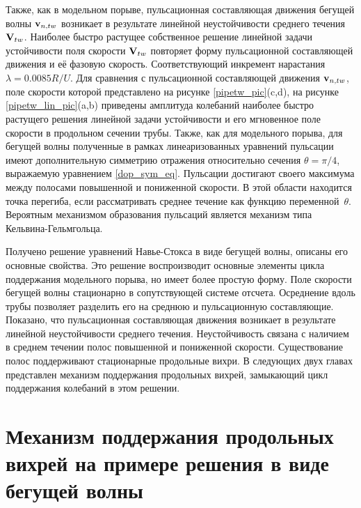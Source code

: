 Также, как в модельном порыве, пульсационная составляющая движения бегущей волны $\mathbf{v}_{n,tw}$ возникает в результате линейной неустойчивости среднего течения $\mathbf{V}_{tw}$. Наиболее быстро растущее собственное решение линейной задачи устойчивости поля скорости $\mathbf{V}_{tw}$ повторяет форму пульсационной составляющей движения и её фазовую скорость. Соответствующий инкремент нарастания $\lambda = 0.0085R/U$. Для сравнения с пульсационной составляющей движения $\mathbf{v}_{n,tw}$, поле скорости которой представлено на рисунке \ref{pipetw_pic}(c,d), на рисунке \ref{pipetw_lin_pic}(a,b) приведены амплитуда колебаний наиболее быстро растущего решения линейной задачи устойчивости и его мгновенное поле скорости в продольном сечении трубы. Также, как для модельного порыва, для бегущей волны полученные в рамках линеаризованных уравнений пульсации имеют дополнительную симметрию отражения относительно сечения $\theta = \pi/4$, выражаемую уравнением \eqref{dop_sym_eq}. Пульсации достигают своего максимума между полосами повышенной и пониженной скорости. В этой области находится точка перегиба, если рассматривать среднее течение как функцию переменной~$\theta$. Вероятным механизмом образования пульсаций является механизм типа Кельвина-Гельмгольца.


Получено решение уравнений Навье-Стокса в виде бегущей волны, описаны его основные свойства. Это решение воспроизводит основные элементы цикла поддержания модельного порыва, но имеет более простую форму. Поле скорости бегущей волны стационарно в сопутствующей системе отсчета. Осреднение вдоль трубы позволяет разделить его на среднюю и пульсационную составляющие. Показано, что пульсационная составляющая движения возникает в результате линейной неустойчивости среднего течения. Неустойчивость связана с наличием в среднем течении полос повышенной и пониженной скорости. Существование полос поддерживают стационарные продольные вихри. В следующих двух главах представлен механизм поддержания продольных вихрей, замыкающий цикл поддержания колебаний в этом решении. 


\section{Механизм поддержания продольных вихрей на примере решения в виде бегущей волны}

